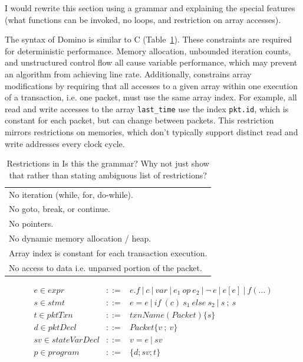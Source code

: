 \ac{I would rewrite this section using a grammar and explaining the special
features (what functions can be invoked, no loops, 
and restriction on array accesses).}

The syntax of Domino is similar to C (Table~\ref{tab:restrict}).
These constraints are required for deterministic performance.  Memory
allocation, unbounded iteration counts, and unstructured control flow
all cause variable performance, which may prevent an algorithm from
achieving line rate.  Additionally, \pktlanguage constrains array
modifications by requiring that all accesses to a given array within
one execution of a transaction, i.e. one packet, must use the same
array index. For example, all read and write accesses to the array
\texttt{last\_time} use the index \texttt{pkt.id}, which is constant
for each packet, but can change between packets. This restriction
mirrors restrictions on memories, which don't typically support
distinct read and write addresses every clock cycle.

\begin{table}
  \begin{tabular}{p{}}
    No iteration (while, for, do-while).\\
    No goto, break, or continue.\\
    No pointers.\\
    No dynamic memory allocation / heap.\\
    Array index is constant for each transaction execution.\\
    No access to data i.e. unparsed portion of the packet.\\
  \end{tabular}

\newcommand{\sep}{~|~}
\begin{eqnarray*}
e \in expr &::=& e.f \sep c \sep var \sep e_1~op~e_2 \sep \neg~e \sep e[e] \sep f(\ldots) \\
%
s \in stmt &::=& e = e \sep if~(c)~s_1~else~s_2 \sep s~;~s \\
%
t \in pktTxn &::=& txnName(Packet) \{ s \} \\
%
d \in pktDecl &::=& Packet \{ v~;~v \} \\
%
sv \in stateVarDecl &::=& v = e \sep sv \\
%
p \in program &::=& \{ d ; sv ; t \}
\end{eqnarray*}

  \caption{Restrictions in \pktlanguage \ac{Is this the grammar? Why not just show 
  that rather than stating ambiguous list of restrictions?}}
  \label{tab:restrict}
\end{table}

